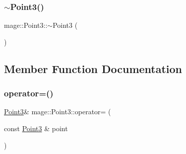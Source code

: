 \hypertarget{structmage_1_1_point3_a952151b6ff72b68569f95445c2ac2495}{}\label{structmage_1_1_point3_a952151b6ff72b68569f95445c2ac2495} 
\subsubsection{\texorpdfstring{$\sim$\+Point3()}{~Point3()}}
{\footnotesize\ttfamily mage\+::\+Point3\+::$\sim$\+Point3 (\begin{DoxyParamCaption}{ }\end{DoxyParamCaption})\hspace{0.3cm}{\ttfamily [default]}}



\subsection{Member Function Documentation}
\hypertarget{structmage_1_1_point3_a53403b16c67a6c7d72910edaec04e371}{}\label{structmage_1_1_point3_a53403b16c67a6c7d72910edaec04e371} 
\subsubsection{\texorpdfstring{operator=()}{operator=()}}
{\footnotesize\ttfamily \hyperlink{structmage_1_1_point3}{Point3}\& mage\+::\+Point3\+::operator= (\begin{DoxyParamCaption}\item[{const \hyperlink{structmage_1_1_point3}{Point3} \&}]{point }\end{DoxyParamCaption})}

